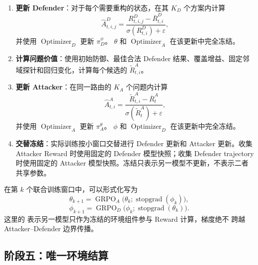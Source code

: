 \documentclass[a4paper,11pt]{article}
\begin{document}
\begin{enumerate}[resume]
    \item \textbf{更新 Defender}：对于每个需要重构的状态，在其 $K_D$ 个方案内计算
    \[
        \widehat A^D_{t,i,j}
        =
        \frac{R^D_{t,i,j}-\overline R^D_{t,i}}
        {\sigma(R^D_{t,i})+\varepsilon},
    \]
    并使用 $\operatorname{Optimizer}_D$ 更新 $\pi_D^{\phi}$。
    $\theta$ 和 $\operatorname{Optimizer}_A$ 在该更新中完全冻结。

    \item \textbf{计算问题价值}：使用初始防御、最佳合法 Defender 结果、覆盖增益、固定邻域探针和回归变化，计算每个候选的 $\widetilde R^A_{t,i}$。

    \item \textbf{更新 Attacker}：在同一路由的 $K_A$ 个问题内计算
    \[
        \widehat A^A_{t,i}
        =
        \frac{\widetilde R^A_{t,i}-\overline R^A_t}
        {\sigma(\widetilde R^A_t)+\varepsilon},
    \]
    并使用 $\operatorname{Optimizer}_A$ 更新 $\pi_A^{\theta}$。
    $\phi$ 和 $\operatorname{Optimizer}_D$ 在该更新中完全冻结。

    \item \textbf{交替冻结}：实际训练按小窗口交替进行 Defender 更新和 Attacker 更新。收集 Attacker Reward 时使用固定的 Defender 模型快照；收集 Defender
    trajectory 时使用固定的 Attacker 模型快照。冻结只表示另一模型不更新，不表示二者
    共享参数。
\end{enumerate}

在第 $k$ 个联合训练窗口中，可以形式化写为
\[
    \theta_{k+1}
    =
    \operatorname{GRPO}_A
    \bigl(\theta_k;\operatorname{stopgrad}(\phi_k)\bigr),
\]
\[
    \phi_{k+1}
    =
    \operatorname{GRPO}_D
    \bigl(\phi_k;\operatorname{stopgrad}(\theta_k)\bigr).
\]
这里的  表示另一模型只作为冻结的环境组件参与 Reward 计算，梯度绝不
跨越 Attacker--Defender 边界传播。

\subsection*{阶段五：唯一环境结算}
\end{document}
